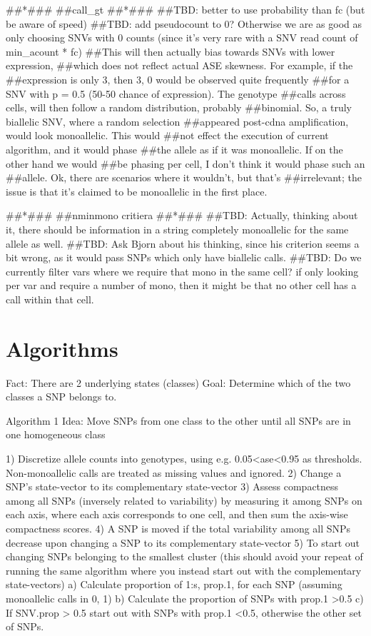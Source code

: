##*###
##call_gt
##*###
##TBD: better to use probability than fc (but be aware of speed)
##TBD: add pseudocount to 0? Otherwise we are as good as only choosing SNVs with 0 counts (since it's very rare with a SNV read count of min_acount * fc)
##This will then actually bias towards SNVs with lower expression,
##which does not reflect actual ASE skewness. For example, if the
##expression is only 3, then {3, 0} would be observed quite frequently
##for a SNV with p = 0.5 (50-50 chance of expression). The genotype
##calls across cells, will then follow a random distribution, probably
##binomial. So, a truly biallelic SNV, where a random selection
##appeared post-cdna amplification, would look monoallelic. This would
##not effect the execution of current algorithm, and it would phase
##the allele as if it was monoallelic. If on the other hand we would
##be phasing per cell, I don't think it would phase such an
##allele. Ok, there are scenarios where it wouldn't, but that's
##irrelevant; the issue is that it's claimed to be monoallelic in the first place.

##*###
##nminmono critiera
##*###
##TBD: Actually, thinking about it, there should be information in a string completely monoallelic for the same allele as well.
##TBD: Ask Bjorn about his thinking, since his criterion seems a bit wrong, as it would pass SNPs which only have biallelic calls.
##TBD: Do we currently filter vars where we require that mono in the
same cell? if only looking per var and require a number of mono, then
it might be that no other cell has a call within that cell.


\section{Algorithms}
Fact: There are 2 underlying states (classes)
Goal: Determine which of the two classes a SNP belongs to.

Algorithm 1
Idea: Move SNPs from one class to the other until all SNPs are in one homogeneous class

1) Discretize allele counts into genotypes, using e.g. 0.05<ase<0.95 as thresholds. Non-monoallelic calls are treated as missing values and ignored.
2) Change a SNP's state-vector to its complementary state-vector
3) Assess compactness among all SNPs (inversely related to variability) by measuring it among SNPs on each axis, where each axis corresponds to one cell, and then sum the axis-wise compactness scores.
4) A SNP is moved if the total variability among all SNPs decrease upon changing a SNP to its complementary state-vector
5) To start out changing SNPs belonging to the smallest cluster (this should avoid your repeat of running the same algorithm where you instead start out with the complementary state-vectors)
a) Calculate proportion of 1:s, prop.1, for each SNP (assuming monoallelic calls in {0, 1})
b) Calculate the proportion of SNPs with prop.1 >0.5
c) If SNV.prop > 0.5 start out with SNPs with prop.1 <0.5, otherwise the other set of SNPs.

